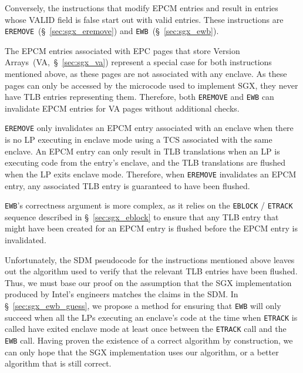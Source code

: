 Conversely, the instructions that modify EPCM entries and result in entries
whose VALID field is false start out with valid entries. These instructions are
\texttt{EREMOVE}~(\S~\ref{sec:sgx_eremove}) and
\texttt{EWB}~(\S~\ref{sec:sgx_ewb}).

The EPCM entries associated with EPC pages that store Version
Arrays~(VA,~\S~\ref{sec:sgx_va}) represent a special case for both instructions
mentioned above, as these pages are not associated with any enclave. As these
pages can only be accessed by the microcode used to implement SGX, they never
have TLB entries representing them. Therefore, both \texttt{EREMOVE} and
\texttt{EWB} can invalidate EPCM entries for VA pages without additional
checks.

\texttt{EREMOVE} only invalidates an EPCM entry associated with an enclave when
there is no LP executing in enclave mode using a TCS associated with the same
enclave. An EPCM entry can only result in TLB translations when an LP is
executing code from the entry's enclave, and the TLB translations are flushed
when the LP exits enclave mode. Therefore, when \texttt{EREMOVE} invalidates
an EPCM entry, any associated TLB entry is guaranteed to have been flushed.

\texttt{EWB}'s correctness argument is more complex, as it relies on the
\texttt{EBLOCK} / \texttt{ETRACK} sequence described in \S~\ref{sec:sgx_eblock}
to ensure that any TLB entry that might have been created for an EPCM entry is
flushed before the EPCM entry is invalidated.

Unfortunately, the SDM pseudocode for the instructions mentioned above leaves
out the algorithm used to verify that the relevant TLB entries have been
flushed. Thus, we must base our proof on the assumption that the SGX
implementation produced by Intel's engineers matches the claims in the SDM.
In \S~\ref{sec:sgx_ewb_guess}, we propose a method for ensuring that
\texttt{EWB} will only succeed when all the LPs executing an enclave's code at
the time when \texttt{ETRACK} is called have exited enclave mode at least once
between the \texttt{ETRACK} call and the \texttt{EWB} call. Having proven the
existence of a correct algorithm by construction, we can only hope that the SGX
implementation uses our algorithm, or a better algorithm that is still correct.

